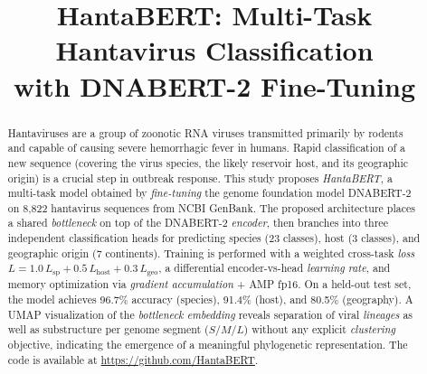 \documentclass[conference]{IEEEtran}
\begin{document}
\title{HantaBERT: Multi-Task Hantavirus Classification\\with DNABERT-2 Fine-Tuning}

\author{%
}

\maketitle

\begin{abstract}
Hantaviruses are a group of zoonotic RNA viruses transmitted primarily by
rodents and capable of causing severe hemorrhagic fever in humans.
Rapid classification of a new sequence (covering the virus species, the
likely reservoir host, and its geographic origin) is a crucial step in
outbreak response. This study proposes \emph{HantaBERT}, a multi-task
model obtained by \emph{fine-tuning} the genome foundation model
\textsc{DNABERT-2} on 8{,}822 hantavirus sequences from NCBI GenBank.
The proposed architecture places a shared \emph{bottleneck} on top of the
DNABERT-2 \emph{encoder}, then branches into three independent
classification heads for predicting species (23 classes), host
(3 classes), and geographic origin (7 continents). Training is performed
with a weighted cross-task \emph{loss} $L = 1{.}0\,L_{\text{sp}} + 0{.}5\,L_{\text{host}}
+ 0{.}3\,L_{\text{geo}}$, a differential encoder-vs-head \emph{learning rate},
and memory optimization via \emph{gradient accumulation} + AMP fp16. On a
held-out test set, the model achieves 96{.}7\% accuracy (species), 91{.}4\%
(host), and 80{.}5\% (geography). A UMAP visualization of the
\emph{bottleneck embedding} reveals separation of viral \emph{lineages}
as well as substructure per genome segment ($S$/$M$/$L$) without any
explicit \emph{clustering} objective, indicating the emergence of a
meaningful phylogenetic representation. The code is available at
\url{https://github.com/HantaBERT}.
\end{abstract}
\end{document}
